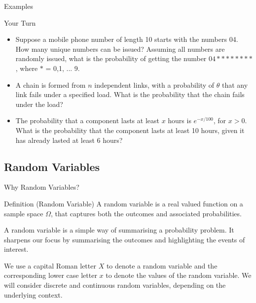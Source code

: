 \documentclass[t,xcolor=pdftex,dvipsnames,table]{beamer}\usepackage[]{graphicx}\usepackage[]{color}
\begin{document}
\begin{frame}{Examples}
\begin{alertblock}{Your Turn}
\begin{itemize}
\item Suppose a mobile phone number of length 10 starts with the numbers 04.  How many unique numbers can be issued?  Assuming all numbers are randomly issued, what is the probability of getting the number $04********$, where $*$ = 0,1, ... 9.  \\

\item A chain is formed from $n$ independent links, with a probability of $\theta$ that any link fails under a  specified load. What is the probability that the chain fails under the load? 

\item The probability that a component lasts at least $x$ hours is $e^{-x/100}$, for $x > 0$. What is the probability  that the component lasts at least 10 hours, given it has already lasted at least 6 hours? 
\end{itemize}
\end{alertblock}
\end{frame}

\subsection[]{Random Variables}
\begin{frame}{Why Random Variables?}

\begin{block}{Definition (Random Variable)}
A random variable is a real valued function on a sample space $\Omega$, that 
captures both the outcomes and associated probabilities.
\end{block}

A random variable is a simple way of summarising a probability problem. It sharpens our focus by summarising the outcomes and highlighting the events of interest. 

\vspace{.5cm}
We use a capital Roman letter $X$ to denote a random variable and the corresponding lower case letter $x$ to denote the values of the random variable. We will consider discrete and continuous random variables, depending on the underlying context.
\end{frame}
\end{document}
